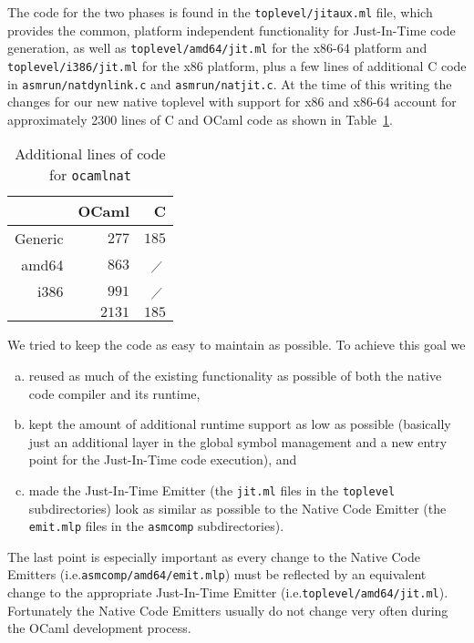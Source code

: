 \documentclass[10pt,a4paper,final,twocolumn]{article}
\makeatletter
\newcommand{\ie}{i.e.\@\xspace}
\makeatother
\begin{document}
The code for the two phases is found in the \texttt{toplevel/jitaux.ml} file, which provides the common, platform
independent functionality for Just-In-Time code generation, as well as \texttt{toplevel/amd64/jit.ml} for the x86-64
platform and \texttt{toplevel/i386/jit.ml} for the x86 platform, plus a few lines of additional C code in
\texttt{asmrun/natdynlink.c} and \texttt{asmrun/natjit.c}. At the time of this writing the changes for our
new native toplevel with support for x86 and x86-64 account for approximately 2300 lines of C and OCaml
code as shown in Table~\ref{tab:Additional_lines_of_code_for_ocamlnat}.

\begin{table}[htb]
  \centering
  \begin{tabular}{r|rr}
    & OCaml & C \\
    \hline
    Generic & $277$ & $185$ \\
    amd64 & $863$ & $\diagup$\, \\
    i386 & $991$ & $\diagup$\, \\
    \hline
    & $2131$ & $185$ \\
  \end{tabular}
  \caption{Additional lines of code for \texttt{ocamlnat}}
  \label{tab:Additional_lines_of_code_for_ocamlnat}
\end{table}

We tried to keep the code as easy to maintain as possible. To achieve this goal we
\begin{enumerate}[(a)]
\item reused as much of the existing functionality as possible of both the native code compiler and
  its runtime,
\item kept the amount of additional runtime support as low as possible (basically just an additional layer in
  the global symbol management and a new entry point for the Just-In-Time code execution), and
\item made the Just-In-Time Emitter (the \texttt{jit.ml} files in the \texttt{toplevel} subdirectories) look as
  similar as possible to the Native Code Emitter (the \texttt{emit.mlp} files in the \texttt{asmcomp}
  subdirectories).
\end{enumerate}
The last point is especially important as every change to the Native Code Emitters
(\ie \texttt{asmcomp/amd64/emit.mlp}) must be reflected by an equivalent change to the appropriate
Just-In-Time Emitter (\ie \texttt{toplevel/amd64/jit.ml}). Fortunately the Native Code Emitters usually
do not change very often during the OCaml development process.
\end{document}
